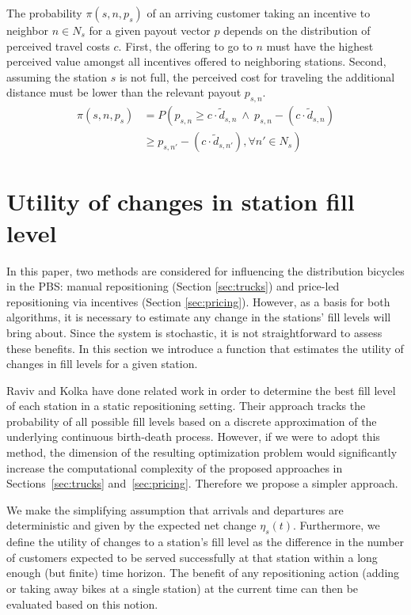 \documentclass{article}
\begin{document}
The probability $\pi(s,n,p_s)$ of an arriving customer taking an incentive to
neighbor $n\in N_s$ for a given payout vector $p$ depends on the distribution of
perceived travel costs $c$. First, the offering to go to $n$ must have the
highest perceived value amongst all incentives offered to neighboring stations.
Second, assuming the station $s$ is not full, the perceived cost for traveling
the additional distance must be lower than the relevant payout $p_{s,n}$.
\begin{equation}
  \label{eq:prob-incentives}
  \begin{aligned}
  \pi(s,n,p_s) &= P\left(p_{s,n} \geq c\cdot\tilde d_{s,n}\ \land\ p_{s,n}-(c\cdot \tilde d_{s,n})\right.\\
&\left.\geq p_{s, n'}-(c\cdot \tilde d_{s,n'}),\forall n'\in N_s\right)
  \end{aligned}
\end{equation}

\section{Utility of changes in station fill level}
\label{sec:utility}
In this paper, two methods are considered for influencing the distribution
bicycles in the PBS: manual repositioning (Section \ref{sec:trucks}) and
price-led repositioning via incentives (Section \ref{sec:pricing}). However, as
a basis for both algorithms, it is necessary to estimate any change in the
stations' fill levels will bring about. Since the system is stochastic, it is
not straightforward to assess these benefits. In this section we introduce a
function that estimates the utility of changes in fill levels for a given
station.

Raviv and Kolka \cite{raviv_optimal_2013} have done related work in order to
determine the best fill level of each station in a static repositioning setting.
Their approach tracks the probability of all possible fill levels based on a
discrete approximation of the underlying continuous birth-death process.
However, if we were to adopt this method, the dimension of the resulting
optimization problem would significantly increase the computational complexity
of the proposed approaches in Sections~\ref{sec:trucks} and~\ref{sec:pricing}.
Therefore we propose a simpler approach.

We make the simplifying assumption that arrivals and departures are
deterministic and given by the expected net change $\eta_s(t)$. Furthermore, we
define the utility of changes to a station's fill level as the difference in the
number of customers expected to be served successfully at that station within a
long enough (but finite) time horizon. The benefit of any repositioning action
(adding or taking away bikes at a single station) at the current time can then
be evaluated based on this notion.
\end{document}
